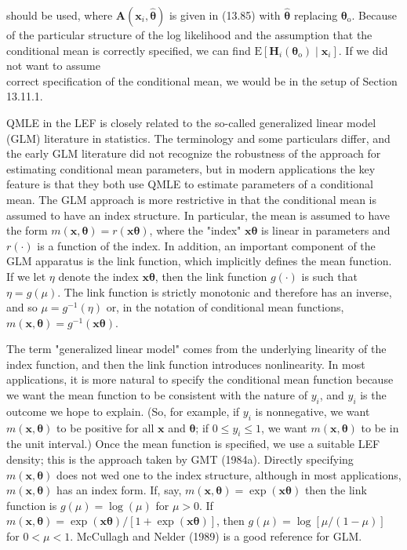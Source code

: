 \documentclass[10pt]{article}
\begin{document}
should be used, where $\mathbf{A}\left(\mathbf{x}_{i}, \hat{\boldsymbol{\theta}}\right)$ is given in (13.85) with $\hat{\boldsymbol{\theta}}$ replacing $\boldsymbol{\theta}_{\mathrm{o}}$. Because of the particular structure of the log likelihood and the assumption that the conditional mean is correctly specified, we can find $\mathrm{E}\left[\mathbf{H}_{i}\left(\boldsymbol{\theta}_{\mathrm{o}}\right) \mid \mathbf{x}_{i}\right]$. If we did not want to assume\\
correct specification of the conditional mean, we would be in the setup of Section 13.11.1.

QMLE in the LEF is closely related to the so-called generalized linear model (GLM) literature in statistics. The terminology and some particulars differ, and the early GLM literature did not recognize the robustness of the approach for estimating conditional mean parameters, but in modern applications the key feature is that they both use QMLE to estimate parameters of a conditional mean. The GLM approach is more restrictive in that the conditional mean is assumed to have an index structure. In particular, the mean is assumed to have the form $m(\mathbf{x}, \boldsymbol{\theta})=r(\mathbf{x} \boldsymbol{\theta})$, where the "index" $\mathbf{x} \boldsymbol{\theta}$ is linear in parameters and $r(\cdot)$ is a function of the index. In addition, an important component of the GLM apparatus is the link function, which implicitly defines the mean function. If we let $\eta$ denote the index $\mathbf{x} \boldsymbol{\theta}$, then the link function $g(\cdot)$ is such that $\eta=g(\mu)$. The link function is strictly monotonic and therefore has an inverse, and so $\mu=g^{-1}(\eta)$ or, in the notation of conditional mean functions, $m(\mathbf{x}, \boldsymbol{\theta})=g^{-1}(\mathbf{x} \boldsymbol{\theta})$.

The term "generalized linear model" comes from the underlying linearity of the index function, and then the link function introduces nonlinearity. In most applications, it is more natural to specify the conditional mean function because we want the mean function to be consistent with the nature of $y_{i}$, and $y_{i}$ is the outcome we hope to explain. (So, for example, if $y_{i}$ is nonnegative, we want $m(\mathbf{x}, \boldsymbol{\theta})$ to be positive for all $\mathbf{x}$ and $\boldsymbol{\theta}$; if $0 \leq y_{i} \leq 1$, we want $m(\mathbf{x}, \boldsymbol{\theta})$ to be in the unit interval.) Once the mean function is specified, we use a suitable LEF density; this is the approach taken by GMT (1984a). Directly specifying $m(\mathbf{x}, \boldsymbol{\theta})$ does not wed one to the index structure, although in most applications, $m(\mathbf{x}, \boldsymbol{\theta})$ has an index form. If, say, $m(\mathbf{x}, \boldsymbol{\theta})=\exp (\mathbf{x} \boldsymbol{\theta})$ then the link function is $g(\mu)=\log (\mu)$ for $\mu>0$. If $m(\mathbf{x}, \boldsymbol{\theta})=\exp (\mathbf{x} \boldsymbol{\theta}) /[1+\exp (\mathbf{x} \boldsymbol{\theta})]$, then $g(\mu)=\log [\mu /(1-\mu)]$ for $0<\mu<1$. McCullagh and Nelder (1989) is a good reference for GLM.
\end{document}
